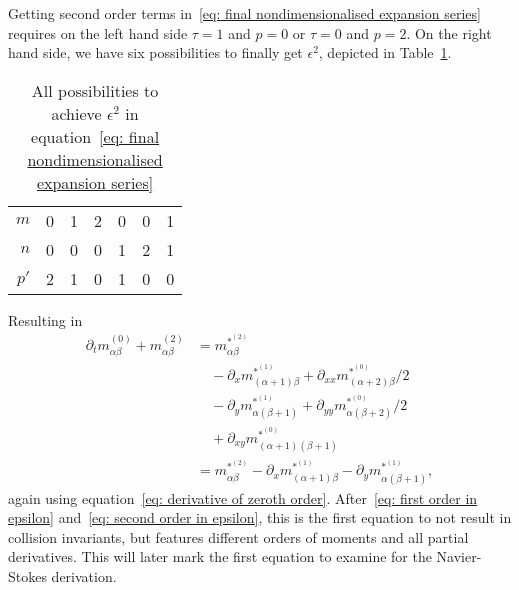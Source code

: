 Getting second order terms in~\eqref{eq: final nondimensionalised expansion series} requires on the left hand side $\tau=1$ and $p=0$ or $\tau=0$ and $p=2$.
On the right hand side, we have six possibilities to finally get $\epsilon^2$, depicted in Table~\ref{table: second order epsilon}.
\begin{table}[h]
  \centering
  \begin{tabular} {r || c | *{2}{c} | *{2}{c} | c}
    $m$  & 0 & 1 & 2 & 0 & 0 & 1 \\
    $n$  & 0 & 0 & 0 & 1 & 2 & 1 \\
    $p'$ & 2 & 1 & 0 & 1 & 0 & 0
  \end{tabular}
  \caption{All possibilities to achieve $\epsilon^2$ in equation~\eqref{eq: final nondimensionalised expansion series}}
\label{table: second order epsilon}
\end{table}
Resulting in
\begin{equation}
  \label{eq: second order in epsilon}
  \begin{aligned}
    \partial_t m_{\alpha\beta}^{(0)} + m_{\alpha\beta}^{(2)}
    & =  m_{\alpha\beta}^{*^{(2)}} \\
    &\quad - \partial_x m_{(\alpha+1)\beta}^{*^{(1)}} + \partial_{xx} m_{(\alpha+2)\beta}^{*^{(0)}}/2 \\
    &\quad - \partial_y m_{\alpha(\beta+1)}^{*^{(1)}} + \partial_{yy} m_{\alpha(\beta+2)}^{*^{(0)}}/2 \\
    &\quad + \partial_{xy} m_{(\alpha+1)(\beta+1)}^{*^{(0)}}\\
    & =  m_{\alpha\beta}^{*^{(2)}} - \partial_x m_{(\alpha+1)\beta}^{*^{(1)}} - \partial_y m_{\alpha(\beta+1)}^{*^{(1)}},
  \end{aligned}
\end{equation}
again using equation~\eqref{eq: derivative of zeroth order}.
After~\eqref{eq: first order in epsilon} and~\eqref{eq: second order in epsilon}, this is the first equation to not result in collision invariants, but features different orders of moments and all partial derivatives.
This will later mark the first equation to examine for the Navier-Stokes derivation.

